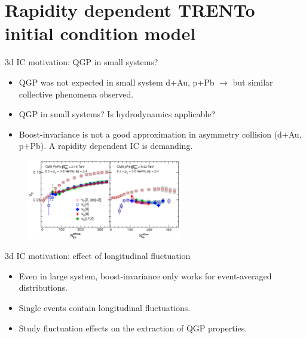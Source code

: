 \documentclass[11pt]{beamer}
\begin{document}
\section{Rapidity dependent TRENTo initial condition model}
\begin{frame}{3d IC motivation: QGP in small systems?}
\begin{itemize}
\item QGP was not expected in small system  d+Au, p+Pb
$\rightarrow$ but similar collective phenomena observed.
\item QGP in small systems? Is hydrodynamics applicable?
\item Boost-invariance is not a good approximation in asymmetry collision (d+Au, p+Pb). A rapidity dependent IC is demanding.
\end{itemize}
\begin{center}
\begin{figure}
\includegraphics[width=0.6\textwidth]{./pics/small.png}
\end{figure}
\end{center}
\end{frame}

\begin{frame}{3d IC motivation: effect of longitudinal fluctuation}
\begin{itemize}
\item Even in large system, boost-invariance only works for event-averaged distributions.
\item Single events contain longitudinal fluctuations.
\item Study fluctuation effects on the extraction of QGP properties.
\end{itemize}
\end{frame}
\end{document}

